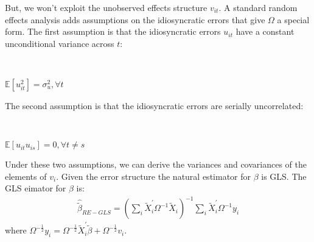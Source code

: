 But, we won't exploit the unobserved effects structure $v_{it}.$
A standard random effects analysis adds assumptions on the idiosyncratic errors that
give $\Omega$ a special form. The first assumption is that the idiosyncratic errors
$u_{it}$ have a constant unconditional variance across $t$:
\begin{assumption}[RE-Homoskedasticity]\label{assumption:RE-homoskedasticity}
    \

    $\mathbb{E}[u_{it}^2] = \sigma_u^2, \forall t$
\end{assumption}
The second assumption is that the idiosyncratic errors are serially uncorrelated:
\begin{assumption}\label{assumption:RE-serial_uncorrelated}
    \

    $\mathbb{E}[u_{it} u_{is}] = 0, \forall t \neq s$
\end{assumption}
Under these two assumptions, we can derive the variances and covariances of the
elements of $v_i$.
Given the error structure the natural estimator for $\beta$ is GLS. The GLS eimator for $\beta$ is:
\begin{gather*}
    \hat{\tilde{\beta}}_{RE-GLS} = \left( \sum_i \tilde{X}_i^{\prime} \Omega^{-1} \tilde{X}_i \right)^{-1} \sum_i \tilde{X}_i^{\prime} \Omega^{-1} y_i
\end{gather*}
where $\Omega ^{-\frac{1}{2}} y_i = \Omega ^{-\frac{1}{2}} \tilde{X}_i^{\prime} \tilde{\beta} + \Omega^{-\frac{1}{2}}v_i.$
